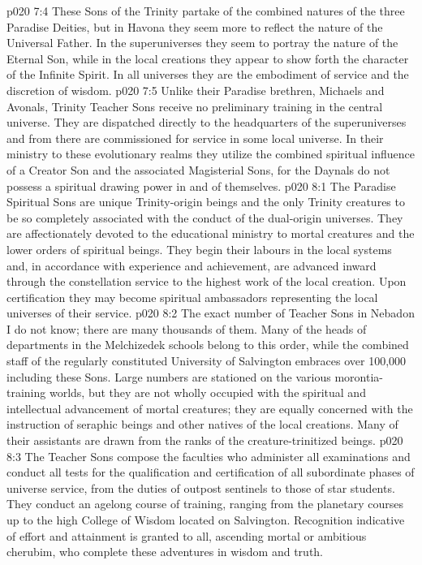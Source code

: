 \vs p020 7:4 These Sons of the Trinity partake of the combined natures of the three Paradise Deities, but in Havona they seem more to reflect the nature of the Universal Father. In the superuniverses they seem to portray the nature of the Eternal Son, while in the local creations they appear to show forth the character of the Infinite Spirit. In all universes they are the embodiment of service and the discretion of wisdom.
\vs p020 7:5 Unlike their Paradise brethren, Michaels and Avonals, Trinity Teacher Sons receive no preliminary training in the central universe. They are dispatched directly to the headquarters of the superuniverses and from there are commissioned for service in some local universe. In their ministry to these evolutionary realms they utilize the combined spiritual influence of a Creator Son and the associated Magisterial Sons, for the Daynals do not possess a spiritual drawing power in and of themselves.
\vs p020 8:1 The Paradise Spiritual Sons are unique Trinity\hyp{}origin beings and the only Trinity creatures to be so completely associated with the conduct of the dual\hyp{}origin universes. They are affectionately devoted to the educational ministry to mortal creatures and the lower orders of spiritual beings. They begin their labours in the local systems and, in accordance with experience and achievement, are advanced inward through the constellation service to the highest work of the local creation. Upon certification they may become spiritual ambassadors representing the local universes of their service.
\vs p020 8:2 The exact number of Teacher Sons in Nebadon I do not know; there are many thousands of them. Many of the heads of departments in the Melchizedek schools belong to this order, while the combined staff of the regularly constituted University of Salvington embraces over 100,000 including these Sons. Large numbers are stationed on the various morontia\hyp{}training worlds, but they are not wholly occupied with the spiritual and intellectual advancement of mortal creatures; they are equally concerned with the instruction of seraphic beings and other natives of the local creations. Many of their assistants are drawn from the ranks of the creature\hyp{}trinitized beings.
\vs p020 8:3 The Teacher Sons compose the faculties who administer all examinations and conduct all tests for the qualification and certification of all subordinate phases of universe service, from the duties of outpost sentinels to those of star students. They conduct an agelong course of training, ranging from the planetary courses up to the high College of Wisdom located on Salvington. Recognition indicative of effort and attainment is granted to all, ascending mortal or ambitious cherubim, who complete these adventures in wisdom and truth.
